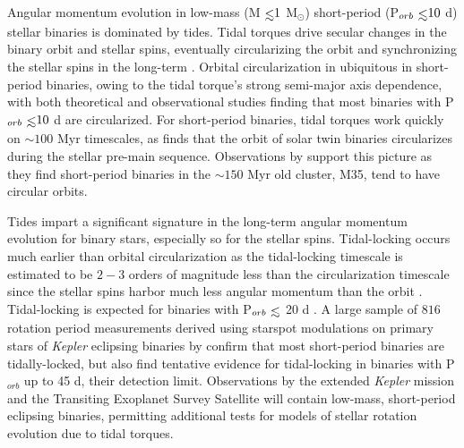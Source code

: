 \documentclass[twocolumn]{aastex61}
\def\lsim{~\rlap{$<$}{\lower 1.0ex\hbox{$\sim$}}}
\newcommand{\kepler}[0]{\textit{Kepler}\xspace}
\begin{document}
Angular momentum evolution in low-mass (M$\lsim 1$ M$_{\odot}$) short-period (P$_{orb} \lsim 10$ d) stellar binaries is dominated by tides.  Tidal torques drive secular changes in the binary orbit and stellar spins, eventually circularizing the orbit and synchronizing the stellar spins in the long-term \citep{Counselman1973}. Orbital circularization in ubiquitous in short-period binaries, owing to the tidal torque's strong semi-major axis dependence, with both theoretical \citep[e.g.][]{Zahn1989} and observational \citep[e.g.][]{Meibom2005,Mazeh2008,Lurie2017} studies finding that most binaries with P$_{orb} \lsim 10$ d are circularized. For short-period binaries, tidal torques work quickly on ${\sim}100$ Myr timescales, as \citet{Zahn1989} finds that the orbit of solar twin binaries circularizes during the stellar pre-main sequence.  Observations by \citet{Meibom2005} support this picture as they find short-period binaries in the ${\sim}150$ Myr old cluster, M35, tend to have circular orbits.

Tides impart a significant signature in the long-term angular momentum evolution for binary stars, especially so for the stellar spins. Tidal-locking occurs much earlier than orbital circularization as the tidal-locking timescale is estimated to be $2-3$ orders of magnitude less than the circularization timescale since the stellar spins harbor much less angular momentum than the orbit \citep{Zahn1989,Witte2002,Mazeh2008}. Tidal-locking is expected for binaries with P$_{orb} \lsim$ 20 d \citep[e.g.][]{Meibom2006,Mazeh2008,Zahn2008,Meibom2015}. A large sample of $816$ rotation period measurements derived using starspot modulations on primary stars of \kepler eclipsing binaries by \citet{Lurie2017} confirm that most short-period binaries are tidally-locked, but also find tentative evidence for tidal-locking in binaries with P$_{orb}$ up to 45 d, their detection limit. Observations by the extended \kepler mission \citep[K2,][]{Howell2014} and the Transiting Exoplanet Survey Satellite \citep[TESS, ][]{Ricker2014,Sullivan2015} will contain low-mass, short-period eclipsing binaries, permitting additional tests for models of stellar rotation evolution due to tidal torques.
 
\end{document}
